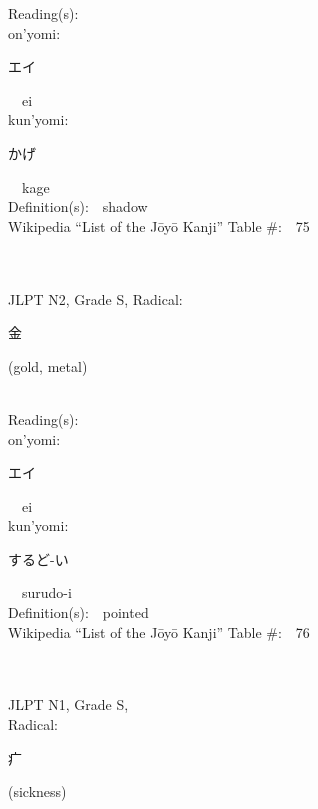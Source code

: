 \begin{multicols}{2}
Reading(s):\ \ \\
{\hspace*{1em}}on'yomi:\ \ \\
{\hspace*{2em}}{\begin{CJK}{UTF8}{min} エイ \end{CJK}}\ \ ei\ \ \\
{\hspace*{1em}}kun'yomi:\ \ \\
{\hspace*{2em}}{\begin{CJK}{UTF8}{min} かげ \end{CJK}}\ \ kage\ \ \\
Definition(s):\ \ shadow \\
Wikipedia ``List of the J\=oy\=o Kanji'' Table \#:\ \ 75 \\
\ \ \\
{\fontsize{34pt}{40pt}  }\ \ \\  %
{JLPT N2, Grade S, Radical:\ \ {\begin{CJK}{UTF8}{min} 金 \end{CJK}} (gold, metal) } \\
Reading(s):\ \ \\
{\hspace*{1em}}on'yomi:\ \ \\
{\hspace*{2em}}{\begin{CJK}{UTF8}{min} エイ \end{CJK}}\ \ ei\ \ \\
{\hspace*{1em}}kun'yomi:\ \ \\
{\hspace*{2em}}{\begin{CJK}{UTF8}{min} するど-い \end{CJK}}\ \ surudo-i\ \ \\
Definition(s):\ \ pointed \\
Wikipedia ``List of the J\=oy\=o Kanji'' Table \#:\ \ 76 \\
\ \ \\
{\fontsize{34pt}{40pt}  }\ \ \\
{JLPT N1, Grade S, \\Radical:\ \ {\begin{CJK}{UTF8}{min} 疒 \end{CJK}} (sickness) } \\

\end{multicols}
